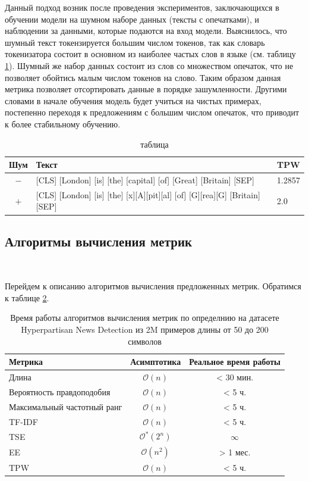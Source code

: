 \documentclass{spbau-diploma}
\begin{document}
Данный подход возник после проведения экспериментов, заключающихся в обучении модели на шумном наборе данных (тексты с опечатками), и наблюдении за данными, которые подаются на вход модели. Выяснилось, что шумный текст токензируется большим числом токенов, так как словарь токенизатора состоит в основном из наиболее частых слов в языке (см. таблицу \ref{table:tokenize_noisy_text}). Шумный же набор данных состоит из слов со множеством опечаток, что не позволяет обойтись малым числом токенов на слово. Таким образом данная метрика позволяет отсортировать данные в порядке зашумленности. Другими словами в начале обучения модель будет учиться на чистых примерах, постепенно переходя к предложениям с большим числом опечаток, что приводит к более стабильному обучению.
%
\begin{table}[h]
	\caption{таблица}
	\label{table:tokenize_noisy_text}
	\centering
	\begin{tabular}{|c|l|l|}
		\hline
		Шум & Текст & TPW \\
		\hline
		$-$ & [CLS] [London] [is] [the] [capital] [of] [Great] [Britain] [SEP] & 1.2857 \\
		$+$ & [CLS] [London] [is] [the] [x][A][pit][al] [of] [G][rea][G] [Britain] [SEP] & 2.0 \\
		\hline
	\end{tabular}
\end{table}

\subsection{Алгоритмы вычисления метрик}
\ 

Перейдем к описанию алгоритмов вычисления предложенных метрик. Обратимся к таблице \ref{table:def_metrics_asymptotics}.

\begin{table}[h]
	\caption{Время работы алгоритмов вычисления метрик по определнию на датасете Hyperpartisan News Detection из 2M примеров длины от 50 до 200 символов}		\label{table:def_metrics_asymptotics}
	\centering
	\begin{tabular}{|l|c|c|}
		\hline
		Метрика & Асимптотика & Реальное время работы \\
		\hline
		Длина & $\mathcal{O}(n)$ & < 30 мин. \\
		Вероятность правдоподобия & $\mathcal{O}(n)$ & < 5 ч.\\
		Максимальный частотный ранг & $\mathcal{O}(n)$ & < 5 ч. \\
		\hline
		TF-IDF & $\mathcal{O}(n)$ & < 5 ч. \\
		\hline
		TSE & $\mathcal{O}^*(2^n)$ & {\bf $\infty$} \\
		EE & $\mathcal{O}(n^2)$ & > 1 мес. \\
		TPW & $\mathcal{O}(n)$ & < 5 ч. \\
		\hline
	\end{tabular}
\end{table}
\end{document}
